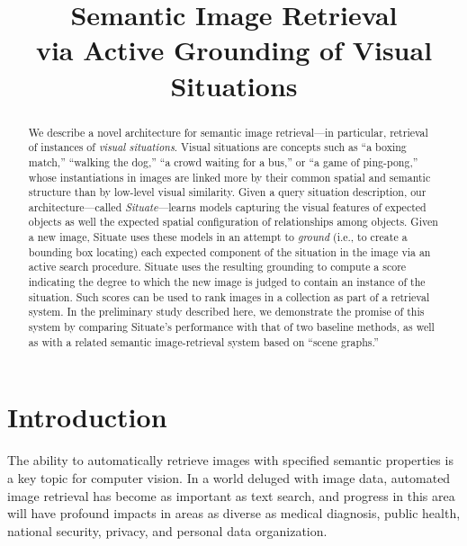 \documentclass[conference]{IEEEtran}
\begin{document}
\title{Semantic Image Retrieval \\ via Active Grounding of Visual Situations}
\author{
}

\maketitle

\begin{abstract}
 
We describe a novel architecture for semantic image retrieval---in
particular, retrieval of instances of {\it visual situations}.  Visual
situations are concepts such as ``a boxing match,'' ``walking the
dog,'' ``a crowd waiting for a bus,'' or ``a game of ping-pong,''
whose instantiations in images are linked more by their common spatial
and semantic structure than by low-level visual similarity.  Given a
query situation description, our architecture---called {\it
  Situate}---learns models capturing the visual features of expected
objects as well the expected spatial configuration of relationships
among objects.  Given a new image, Situate uses these models in an
attempt to {\it ground} (i.e., to create a bounding box locating)
each expected component of the situation in the image via an active
search procedure.  Situate uses the resulting grounding to compute a
score indicating the degree to which the new image is judged to
contain an instance of the situation.  Such scores can be used to rank
images in a collection as part of a retrieval system.  In the
preliminary study described here, we demonstrate the promise of this
system by comparing Situate's performance with that of two baseline
methods, as well as with a related semantic image-retrieval system
based on ``scene graphs.''

\end{abstract}

\section{Introduction}

The ability to automatically retrieve images with specified semantic
properties is a key topic for computer vision.  In a world deluged
with image data, automated image retrieval has become as important as
text search, and progress in this area will have profound impacts in
areas as diverse as medical diagnosis, public health, national
security, privacy, and personal data organization.
\end{document}

